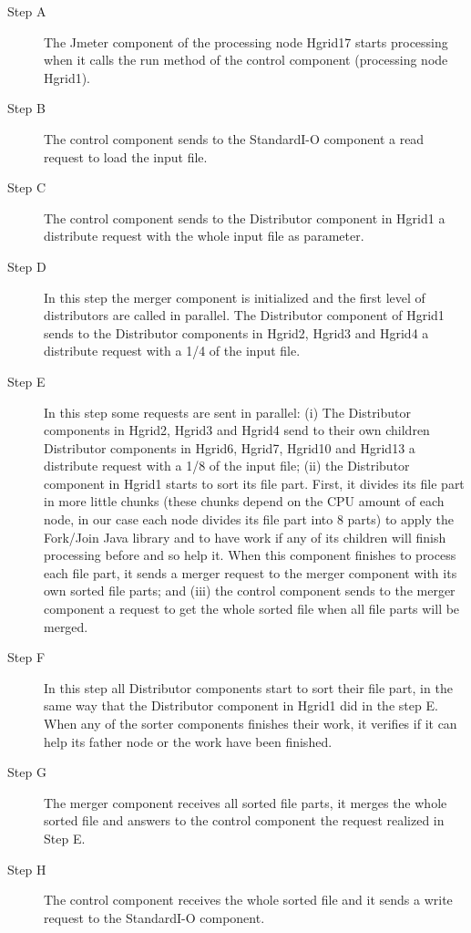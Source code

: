 \begin{description}
	\item [Step A] The Jmeter component of the processing node Hgrid17 starts processing when it calls the run method of the control component (processing node Hgrid1).
	\item [Step B] The control component sends to the StandardI-O component a read request to load the input file.
	\item [Step C] The control component sends to the Distributor component in Hgrid1 a distribute request with the whole input file as parameter.
	\item [Step D] In this step the merger component is initialized and the first level of distributors are called in parallel. The Distributor component of Hgrid1 sends to the Distributor components in Hgrid2, Hgrid3 and Hgrid4 a distribute request with a 1/4 of the input file.
	\item [Step E] In this step some requests are sent in parallel: (i) The Distributor components in Hgrid2, Hgrid3 and Hgrid4 send to their own children Distributor components in Hgrid6, Hgrid7, Hgrid10 and Hgrid13 a distribute request with a 1/8 of the input file; (ii) the Distributor component in Hgrid1 starts to sort its file part. First, it divides its file part in more little chunks (these chunks depend on the CPU amount of each node, in our case each node divides its file part into 8 parts) to apply the Fork/Join Java library and to have work if any of its children will finish processing before and so help it. When this component finishes to process each file part, it sends a merger request to the merger component with its own sorted file parts; and (iii) the control component sends to the merger component a request to get the whole sorted file when all file parts will be merged.
	\item [Step F] In this step all Distributor components start to sort their file part, in the same way that the Distributor component in Hgrid1 did in the step E. When any of the sorter components finishes their work, it verifies if it can help its father node or the work have been finished.
	\item [Step G] The merger component receives all sorted file parts, it merges the whole sorted file and answers to the control component the request realized in Step E.
	\item [Step H] The control component receives the whole sorted file and it sends a write request to the StandardI-O component.
\end{description}

